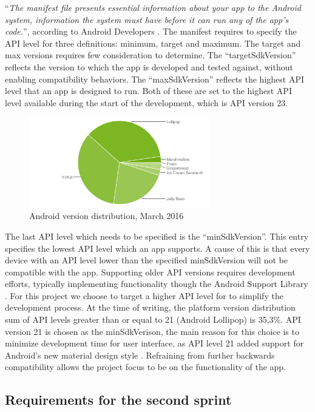 ``\textit{The manifest file presents essential information about your app to the Android system, information the system must have before it can run any of the app's code.}'', according to Android Developers \cite{androidManifest}.
The manifest requires to specify the API level for three definitions: minimum, target and maximum. 
The target and max versions requires few consideration to determine.
The ``targetSdkVersion'' reflects the version to which the app is developed and tested against, without enabling compatibility behaviors.
The ``maxSdkVersion'' reflects the highest API level that an app is designed to run.
Both of these are set to the highest API level available during the start of the development, which is API version 23.

\begin{figure}[h!]
	\centering
	\includegraphics[width=0.7\textwidth]{figures/android-chart-march.png}
	\caption{Android version distribution, March 2016 \cite{androidDashboard}}
	\label{fig:dashboard}
\end{figure}

The last API level which needs to be specified is the ``minSdkVersion''.
This entry specifies the lowest API level which an app supports.
A cause of this is that every device with an API level lower than the specified minSdkVersion will not be compatible with the app.
Supporting older API versions requires development efforts, typically implementing functionality though the Android Support Library \cite{androidSL}.
For this project we choose to target a higher API level for to simplify the development process.
At the time of writing, the platform version distribution sum of API levels greater than or equal to 21 (Android Lollipop) is 35,3\%.
API version 21 is chosen as the minSdkVerison, the main reason for this choice is to minimize development time for user interface, as API level 21 added support for Android's new material design style \cite{android5API}. Refraining from further backwards compatibility allows the project focus to be on the functionality of the app. 






\subsection{Requirements for the second sprint}
